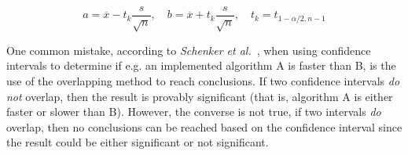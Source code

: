 \begin{equation} a = \overline{x} - t_k\frac{s}{\sqrt{n}}, \quad
   b = \overline{x} + t_k\frac{s}{\sqrt{n}}, \quad
t_k = t_{1-\alpha/2,n-1} \end{equation}

One common mistake, according to \emph{Schenker et al.}~\cite{schenker2001judging}, when using confidence intervals to determine if e.g. an implemented algorithm A is faster than B, is the use of the overlapping method to reach conclusions. If two confidence intervals \emph{do not} overlap, then the result is provably significant (that is, algorithm A is either faster or slower than B). However, the converse is not true, if two intervals \emph{do} overlap, then no conclusions can be reached based on the confidence interval since the result could be either significant or not significant.


